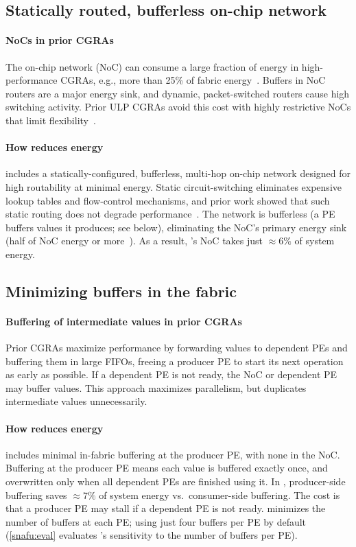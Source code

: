 \subsection{Statically routed, bufferless on-chip network}

\paragraph{NoCs in prior CGRAs}
%
The on-chip network (NoC) can consume a large fraction of energy in high-performance
CGRAs,
%
e.g., more than 25\% of fabric energy~\cite{nowatzki:isca17:stream-dataflow,karunaratne2017hycube}.
%
Buffers in NoC routers are a major energy sink, and dynamic, packet-switched
routers cause high switching activity.
%
Prior ULP CGRAs avoid this cost with highly restrictive NoCs that limit
flexibility~\cite{ipa,cma,srp}.

\paragraph{How \snafu reduces energy}
%
\snafuframe includes a statically-configured, bufferless, multi-hop on-chip
network designed for high routability at minimal energy.
% 
Static circuit-switching eliminates expensive lookup tables and flow-control
mechanisms, and prior work showed that such static routing does not degrade
performance~\cite{karunaratne2017hycube}.
%
The network is bufferless (a PE buffers values it produces; see below),
eliminating the NoC's primary energy sink 
(half of NoC energy or more~\cite{moscibroda2009case}).
  As a result, \snafu's NoC takes just $\approx 6\%$ of system energy.


\subsection{Minimizing buffers in the fabric}

\paragraph{Buffering of intermediate values in prior CGRAs}
%
Prior CGRAs maximize performance by forwarding values to dependent PEs
and buffering them in large FIFOs,
freeing a producer PE to start its next operation as early as possible.
%
If a dependent PE is not ready, the NoC or dependent PE may buffer values. 
%
This approach maximizes parallelism, but duplicates intermediate values unnecessarily.

\paragraph{How \snafu reduces energy}
%
\snafuframe includes minimal in-fabric buffering at the producer PE, with none
in the NoC.
%
Buffering at the producer PE means each value is buffered exactly once, and
overwritten only when all dependent PEs are finished using it.
%
In \snafuarch, producer-side buffering saves $\approx7\%$ of system energy
vs.\ consumer-side buffering.
%
The cost is that a producer PE may stall if a dependent PE is not ready.
%
\snafuframe minimizes the number of buffers at each PE; using just four buffers per PE by default
(\autoref{snafu:eval} evaluates \snafuframe's sensitivity to the number of buffers per PE).

